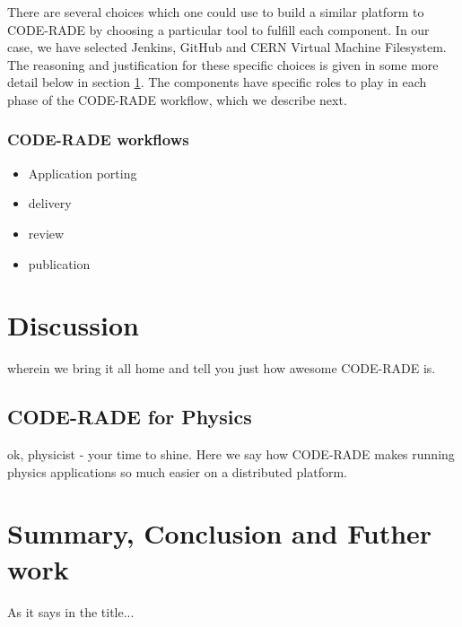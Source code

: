 \documentclass[a4paper]{jpconf}
\begin{document}
There are several choices  which one could use to build a similar platform to CODE-RADE by choosing a particular tool to fulfill each component. In our case, we have selected Jenkins\cite{Jenkins}, GitHub\cite{Github} and CERN Virtual Machine Filesystem\cite{CVMFS}. The reasoning and justification for these specific choices is given in some more detail below in section \ref{Discussion}. The components have specific roles to play in each phase of the CODE-RADE workflow, which we describe next.

\subsubsection{CODE-RADE workflows}

\begin{itemize}
	\item Application porting
   \item delivery
   \item review
   \item publication
\end{itemize}

\section{Discussion}\label{Discussion}

wherein we bring it all home and tell you just how awesome CODE-RADE is.

\subsection{CODE-RADE for Physics}

ok, physicist - your time to shine. Here we say how CODE-RADE makes running physics applications so much easier on a distributed platform.

\section{Summary, Conclusion and Futher work}

As it says in the title...
\end{document}
